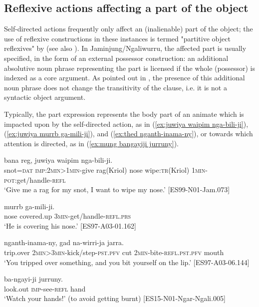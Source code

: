 \documentclass[output=paper,colorlinks,citecolor=brown]{langscibook}
\begin{document}
\subsection{Reflexive actions affecting a part of the object} \label{sec:SchultzeBernd:4.2}

Self-directed actions frequently only affect an (inalienable) part of the object; the use of reflexive constructions in these instances is termed "partitive object reflexives" by \citet[195--196]{Geniusiene1987} (see also \citealt{Gabyinpress}). In Jaminjung/Ngaliwurru, the affected part is usually specified, in the form of an external possessor construction: an additional absolutive noun phrase representing the part is licensed if the whole (possessor) is indexed as a core argument. As pointed out in , the presence of this additional noun phrase does not change the transitivity of the clause, i.e. it is not a syntactic object argument.

Typically, the part expression represents the body part of an animate which is impacted upon by the self-directed action, as in (\ref{ex:juwiya waipim nga-bili-ji}), (\ref{ex:juwiya murrb ga-mili-ji}), and (\ref{ex:thed nganth-inama-ny}), or towards which attention is directed, as in (\ref{ex:mung bangayiji jurruny}).

\ea
{} {bana} {reg}, {juwiya} {waipim} {nga-bili-ji}. \\
snot=\textsc{dat} \textsc{imp:2min>1min}-give rag(Kriol) nose wipe:\textsc{tr}(Kriol) \textsc{1min-pot}:get/handle-\textsc{refl} \\
\glt `Give me a rag for my snot, I want to wipe my nose.' [ES99-N01-Jam.073]
\label{ex:juwiya waipim nga-bili-ji}
\z

\ea
{} {murrb} {ga-mili-ji}. \\
nose covered.up \textsc{3min}-get/handle-\textsc{refl.prs} \\
\glt `He is covering his nose.' [ES97-A03-01.162]
\label{ex:juwiya murrb ga-mili-ji}
\z

\ea
{} {nganth-inama-ny}, {gad} {na-wirri-ja} {jarra}. \\
trip.over \textsc{2min>3min}-kick/step-\textsc{pst.pfv} cut \textsc{2min}-bite-\textsc{refl.pst.pfv} mouth \\
\glt `You tripped over something, and you bit yourself on the lip.' [ES97-A03-06.144]
\label{ex:thed nganth-inama-ny}
\z

\ea
{} {ba-ngayi-ji} {jurruny}. \\
look.out \textsc{imp}-see-\textsc{refl} hand \\
\glt `Watch your hands!' (to avoid getting burnt) [ES15-N01-Ngar-Ngali.005]
\label{ex:mung bangayiji jurruny}
\z
\end{document}

